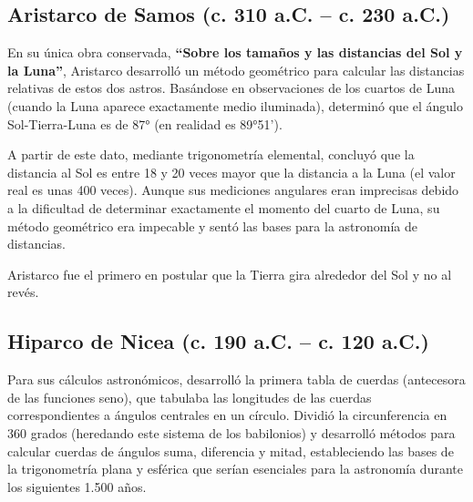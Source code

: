 \documentclass[a4paper,12pt]{article} %
\begin{document}
\subsection{ Aristarco de Samos (c. 310 a.C. -- c. 230 a.C.)}
\begin{justify}
	En su única obra conservada, \textbf{``Sobre los tamaños y las distancias del Sol y la Luna''}, Aristarco desarrolló un método 
	geométrico para calcular las distancias relativas de estos dos astros. Basándose en observaciones de los cuartos de Luna 
	(cuando la Luna aparece exactamente medio iluminada), determinó que el ángulo Sol-Tierra-Luna es de 87° (en realidad es 89°51'). 
\end{justify}

\begin{justify}
	A partir de este dato, mediante trigonometría elemental, concluyó que la distancia al Sol es entre 18 y 20 veces mayor que la distancia a la Luna 
	(el valor real es unas 400 veces). Aunque sus mediciones angulares eran imprecisas debido a la dificultad de determinar exactamente el momento del cuarto de Luna, 
	su método geométrico era impecable y sentó las bases para la astronomía de distancias.
\end{justify}

\begin{justify}
	Aristarco fue el primero en postular que la Tierra gira alrededor del Sol y no al revés.
\end{justify}

\subsection{ Hiparco de Nicea (c. 190 a.C. -- c. 120 a.C.)}
\begin{justify}
	Para sus cálculos astronómicos, desarrolló la primera tabla de cuerdas (antecesora de las funciones seno), 
	que tabulaba las longitudes de las cuerdas correspondientes a ángulos centrales en un círculo. Dividió la circunferencia en 360 grados
	(heredando este sistema de los babilonios) y desarrolló métodos para calcular cuerdas de ángulos suma, diferencia y mitad, estableciendo 
	las bases de la trigonometría plana y esférica que serían esenciales para la astronomía durante los siguientes 1.500 años.
\end{justify}
\end{document}
